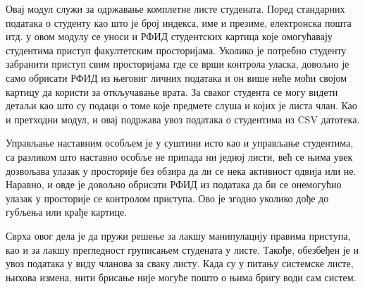 \documentclass[a4paper, 12pt, diplomski]{etfcyr}
\makeatletter
\gdef\tshortstack{\@ifnextchar[\@tshortstack{\@tshortstack[c]}}
\let\@tshortstack\@shortstack
\makeatother
\begin{document}
\begin{justify}
\begin{labeling}{\smash{\tshortstack[l]{Управљање\\активностима}}}
						\item[\smash{\tshortstack[l]{Управљање\\студентима}}]
							\begin{justify}
								Овај модул служи за одржавање комплетне листе студената. Поред стандарних података о студенту као што је број индекса, име и презиме, електронска пошта итд. у овом модулу се уноси и РФИД студентских картица које омогућавају студентима приступ факултетским просторијама. Уколико је потребно студенту забранити приступ свим просторијама где се врши контрола уласка, довољно је само обрисати РФИД из његовиг личних података и он више неће моћи својом картицу да користи за откључавање врата.
								За сваког студента се могу видети детаљи као што су подаци о томе које предмете слуша и којих је листа члан.
								Као и претходни модул, и овај подржава увоз података о студентима из CSV датотека.
							\end{justify}

						\newpage

						\item[\smash{\tshortstack[l]{Управљање\\наставним\\особљем}}]
							\begin{justify}
								Управљање наставним особљем је у суштини исто као и управљање студентима, са разликом што наставно особље не припада ни једној листи, већ се њима увек дозвољава улазак у просторије без обзира да ли се нека активност одвија или не. Наравно, и овде је довољно обрисати РФИД из података да би се онемогућио улазак у просторије се контролом приступа. Ово је згодно уколико дође до губљења или крађе картице.
							\end{justify}

						\item[\smash{\tshortstack[l]{Управљање\\листама}}]
							\begin{justify}
								Сврха овог дела је да пружи решење за лакшу манипулацију правима приступа, као и за лакшу прегледност груписањем студената у листе. Такође, обезбеђен је и увоз података у виду чланова за сваку листу. Када су у питању системске листе, њихова измена, нити брисање није могуће пошто о њима бригу води сам систем.
							\end{justify}


\end{labeling}
\end{justify}
\end{document}
